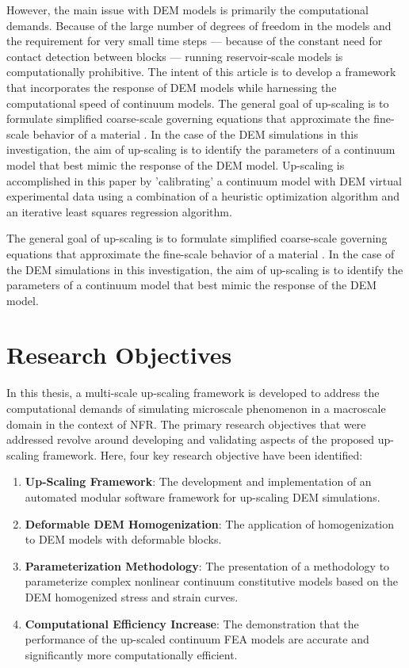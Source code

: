 However, the main issue with DEM models is primarily the computational demands. Because of the large number of degrees of freedom in the models and the requirement for very small time steps --- because of the constant need for contact detection between blocks --- running reservoir-scale models is computationally prohibitive. The intent of this article is to develop a framework that incorporates the response of DEM models while harnessing the computational speed of continuum models. The general goal of up-scaling is to formulate simplified coarse-scale governing equations that approximate the fine-scale behavior of a material \citep{Geers_2010}. In the case of the DEM simulations in this investigation, the aim of up-scaling is to identify the parameters of a continuum model that best mimic the response of the DEM model.  Up-scaling is accomplished in this paper by 'calibrating' a continuum model with DEM virtual experimental data using a combination of a heuristic optimization algorithm and an iterative least squares regression algorithm.

The general goal of up-scaling is to formulate simplified coarse-scale governing equations that approximate the fine-scale behavior of a material \citep{Geers_2010}. In the case of the DEM simulations in this investigation, the aim of up-scaling is to identify the parameters of a continuum model that best mimic the response of the DEM model.

\section{Research Objectives}

In this thesis, a multi-scale up-scaling framework is developed to address the computational demands of simulating microscale phenomenon in a macroscale domain in the context of NFR. The primary research objectives that were addressed revolve around developing and validating aspects of the proposed up-scaling framework. Here, four key research objective have been identified:

\begin{enumerate}
\item \textbf{Up-Scaling Framework}: The development and implementation of an automated modular software framework for up-scaling DEM simulations.
\item \textbf{Deformable DEM Homogenization}: The application of homogenization to DEM models with deformable blocks.
\item \textbf{Parameterization Methodology}: The presentation of a methodology to parameterize complex nonlinear continuum constitutive models based on the DEM homogenized stress and strain curves.
\item \textbf{Computational Efficiency Increase}: The demonstration that the performance of the up-scaled continuum FEA models are accurate and significantly more computationally efficient.
\end{enumerate}

